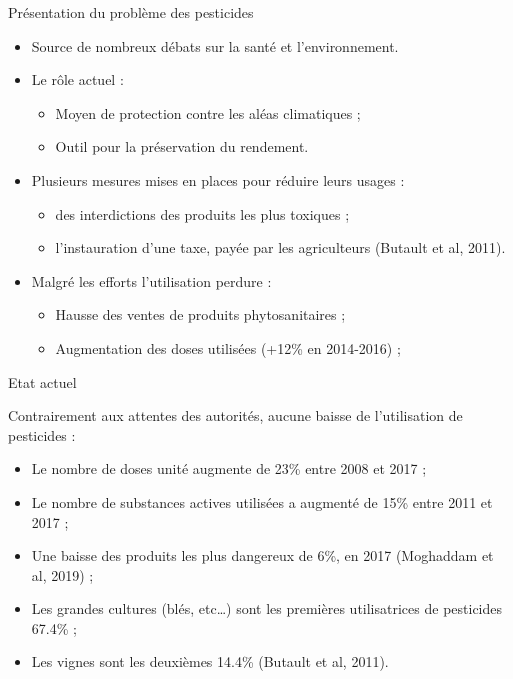\documentclass[11pt,ignorenonframetext,]{beamer}
\providecommand{\tightlist}{%
  \setlength{\itemsep}{0pt}\setlength{\parskip}{0pt}}
\begin{document}
\begin{frame}{Présentation du problème des pesticides}
\protect\hypertarget{presentation-du-probleme-des-pesticides}{}

\begin{itemize}
\tightlist
\item
  Source de nombreux débats sur la santé et l'environnement.
\item
  Le rôle actuel :

  \begin{itemize}
  \tightlist
  \item
    Moyen de protection contre les aléas climatiques ;
  \item
    Outil pour la préservation du rendement.
  \end{itemize}
\item
  Plusieurs mesures mises en places pour réduire leurs usages :

  \begin{itemize}
  \tightlist
  \item
    des interdictions des produits les plus toxiques ;
  \item
    l'instauration d'une taxe, payée par les agriculteurs (Butault et
    al, 2011).
  \end{itemize}
\item
  Malgré les efforts l'utilisation perdure :

  \begin{itemize}
  \tightlist
  \item
    Hausse des ventes de produits phytosanitaires ;
  \item
    Augmentation des doses utilisées (+12\% en 2014-2016) ;
  \end{itemize}
\end{itemize}

\end{frame}

\begin{frame}{Etat actuel}
\protect\hypertarget{etat-actuel}{}

Contrairement aux attentes des autorités, aucune baisse de l'utilisation
de pesticides :

\begin{itemize}
\tightlist
\item
  Le nombre de doses unité augmente de 23\% entre 2008 et 2017 ;
\item
  Le nombre de substances actives utilisées a augmenté de 15\% entre
  2011 et 2017 ;
\item
  Une baisse des produits les plus dangereux de 6\%, en 2017 (Moghaddam
  et al, 2019) ;
\item
  Les grandes cultures (blés, etc\ldots{}) sont les premières
  utilisatrices de pesticides 67.4\% ;
\item
  Les vignes sont les deuxièmes 14.4\% (Butault et al, 2011).
\end{itemize}

\end{frame}
\end{document}
